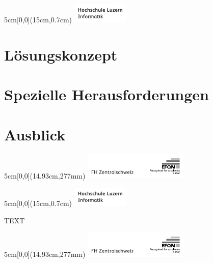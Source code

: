 \documentclass[
	a4paper
]{scrartcl}
\begin{document}
\newpage

\begin{textblock*}{5cm}[0,0](15cm,0.7cm)
	\includegraphics[keepaspectratio,width=2.7cm]{img/HSLU_Logo_Header}
\end{textblock*}

\section{Lösungskonzept}

\section{Spezielle Herausforderungen}

\section{Ausblick}

\begin{textblock*}{5cm}[0,0](14.93cm,277mm)
	\includegraphics[keepaspectratio,width=5cm]{img/FHZ_Logo}
\end{textblock*}

\newpage

\begin{textblock*}{5cm}[0,0](15cm,0.7cm)
	\includegraphics[keepaspectratio,width=2.7cm]{img/HSLU_Logo_Header}
\end{textblock*}

TEXT

\begin{textblock*}{5cm}[0,0](14.93cm,277mm)
	\includegraphics[keepaspectratio,width=5cm]{img/FHZ_Logo}
\end{textblock*}

\newpage
\end{document}
